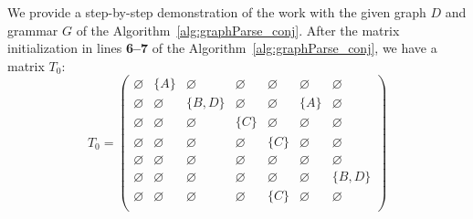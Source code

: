 We provide a step-by-step demonstration of the work with the given graph $D$ and grammar $G$ of the Algorithm~\ref{alg:graphParse_conj}. After the matrix initialization in lines \textbf{6--7} of the Algorithm~\ref{alg:graphParse_conj}, we have a matrix $T_0$:
{\small
    \[
    T_0 = \begin{pmatrix}
    \varnothing & \{A\} & \varnothing & \varnothing & \varnothing & \varnothing & \varnothing \\
    
    \varnothing & \varnothing & \{B, D\} & \varnothing & \varnothing & \{A\} & \varnothing \\
    
    \varnothing & \varnothing & \varnothing & \{C\} & \varnothing & \varnothing & \varnothing \\
    
    \varnothing & \varnothing & \varnothing & \varnothing & \{C\} & \varnothing & \varnothing \\
    
    \varnothing & \varnothing & \varnothing & \varnothing & \varnothing & \varnothing & \varnothing \\
    
    \varnothing & \varnothing & \varnothing & \varnothing & \varnothing & \varnothing & \{B, D\} \\
    
    \varnothing & \varnothing & \varnothing & \varnothing & \{C\} & \varnothing & \varnothing \\
    \end{pmatrix}
    \]
    }


